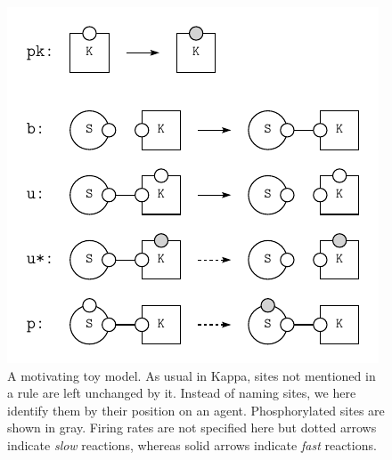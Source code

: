 \begin{figure}[!h]
  \vskip -0.1cm
  \begin{center}
    \includegraphics[scale=0.9]{figures/model.pdf}
  \end{center}
  \vskip -0.1cm
  \caption{A motivating toy model. As usual in Kappa, sites not
    mentioned in a rule are left unchanged by it. Instead of naming
    sites, we here identify them by their position on an
    agent. Phosphorylated sites are shown in gray. Firing rates are
    not specified here but dotted arrows indicate \textit{slow}
    reactions, whereas solid arrows indicate \textit{fast} reactions.}
  \label{fig:model}
\end{figure}
